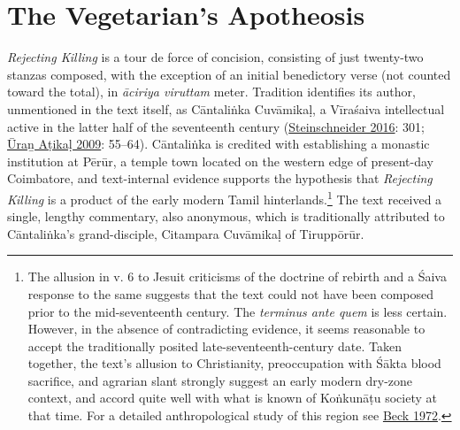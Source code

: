 \section{The Vegetarian’s Apotheosis}
      \emph{Rejecting Killing }is a tour de force of concision, consisting of just twenty-two stanzas composed, with the exception of an initial benedictory verse (not counted toward the total), in \emph{āciriya viruttam} meter. Tradition identifies its author, unmentioned in the text itself, as Cāntaliṅka Cuvāmikaḷ, a Vīraśaiva intellectual active in the latter half of the seventeenth century (\hyperref[Steinschneider2016]{Steinschneider 2016}: 301; \hyperref[UranAtikal2009]{Ūraṉ Aṭikaḷ 2009}: 55–64). Cāntaliṅka is credited with establishing a monastic institution at Pērūr, a temple town located on the western edge of present-day Coimbatore, and text-internal evidence supports the hypothesis that \emph{Rejecting Killing} is a product of the early modern Tamil hinterlands.\footnote{%
The allusion in v. 6 to Jesuit criticisms of the doctrine of rebirth and a Śaiva response to the same suggests that the text could not have been composed prior to the mid-seventeenth century. The \emph{terminus ante quem} is less certain. However, in the absence of contradicting evidence, it seems reasonable to accept the traditionally posited late-seventeenth-century date. Taken together, the text’s allusion to Christianity, preoccupation with Śākta blood sacrifice, and agrarian slant strongly suggest an early modern dry-zone context, and accord quite well with what is known of Koṅkunāṭu society at that time. For a detailed anthropological study of this region see \hyperref[Beck1972]{Beck 1972}. 
}
 The text received a single, lengthy commentary, also anonymous, which is traditionally attributed to Cāntaliṅka’s grand-disciple, Citampara Cuvāmikaḷ of Tiruppōrūr.


